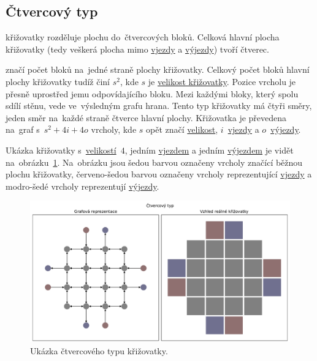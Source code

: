 \subsection{Čtvercový typ}\label{subsec:ctvercovy_typ}

 křižovatky rozděluje plochu do~čtvercových bloků.
Celková hlavní plocha křižovatky (tedy veškerá plocha mimo
\hyperref[par:vjezdy]{vjezdy} a \hyperref[par:vyjezdy]{výjezdy}) tvoří čtverec.

 značí počet bloků na~jedné straně plochy křižovatky.
Celkový počet bloků hlavní plochy křižovatky tudíž činí $s^2$,
kde $s$ je \hyperref[par:velikost_krizovatky]{velikost křižovatky}.
Pozice vrcholu je přesně uprostřed jemu odpovídajícího bloku.
Mezi každými bloky, který spolu sdílí stěnu, vede ve~výsledným grafu hrana.
Tento typ křižovatky má čtyři směry, jeden směr na~každé straně čtverce hlavní plochy.
Křižovatka je převedena na~graf s~$s^2 + 4i + 4o$ vrcholy,
kde $s$ opět značí \hyperref[par:velikost_krizovatky]{velikost},
$i$~\hyperref[par:vjezdy]{vjezdy} a $o$~\hyperref[par:vyjezdy]{výjezdy}.

Ukázka křižovatky s~\hyperref[par:velikost_krizovatky]{velikostí}~$4$, jedním \hyperref[par:vjezdy]{vjezdem} a
jedním \hyperref[par:vyjezdy]{výjezdem} je vidět na~obrázku~\ref{fig:square_type_graph}.
Na~obrázku jsou šedou barvou označeny vrcholy značící běžnou plochu křižovatky,
červeno-šedou barvou označeny vrcholy reprezentující \hyperref[par:vjezdy]{vjezdy} a
modro-šedé vrcholy reprezentují \hyperref[par:vyjezdy]{výjezdy}.

\begin{figure}[h]
	\centering
	\includegraphics[width=\textwidth]{../img/Square_grid}
	\caption{Ukázka čtvercového typu křižovatky.}
	\label{fig:square_type_graph}
\end{figure}

